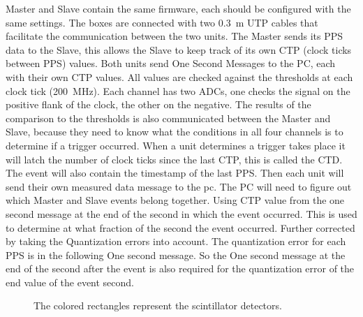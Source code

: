 Master and Slave contain the same firmware, each should be configured
with the same settings. The boxes are connected with two
\SI{0.3}{\meter} UTP cables that facilitate the communication between
the two units. The Master sends its PPS data to the Slave, this allows
the Slave to keep track of its own CTP (clock ticks between PPS) values.
Both units send One Second Messages to the PC, each with their own CTP
values. All \adc values are checked against the thresholds at each clock
tick (\SI{200}{\mega\hertz}). Each channel has two ADCs, one checks the
signal on the positive flank of the clock, the other on the negative.
The results of the comparison to the thresholds is also communicated
between the Master and Slave, because they need to know what the
conditions in all four channels is to determine if a trigger occurred.
When a unit determines a trigger takes place it will latch the number of
clock ticks since the last CTP, this is called the CTD. The event will
also contain the timestamp of the last PPS. Then each unit will send
their own measured data message to the pc. The PC will need to figure
out which Master and Slave events belong together. Using CTP value from
the one second message at the end of the second in which the event
occurred. This is used to determine at what fraction of the second the
event occurred. Further corrected by taking the Quantization errors into
account. The quantization error for each PPS is in the following One
second message. So the One second message at the end of the second after
the event is also required for the quantization error of the end value
of the event second.

\begin{figure}
    \centering
    
    \caption{ The colored
             rectangles represent the scintillator detectors.}
    \label{fig:4_detector_station}
\end{figure}
